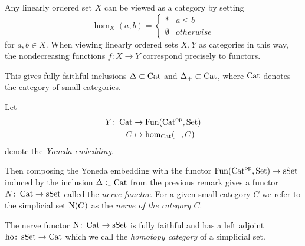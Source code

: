 \begin{remark}
    Any linearly ordered set $X$ can be viewed as a category by setting
    \begin{equation*}
        \hom_{X}(a,b)=\begin{cases}
            * & a\leq b\\
            \emptyset & otherwise
        \end{cases}
    \end{equation*}
    for $a,b\in X$.
    When viewing linearly ordered sets $X,Y$ as categories in this way, the nondecreasing functions $f\colon X\to Y$ correspond precisely to functors.

    This gives fully faithful inclusions $\Delta\subset\operatorname{Cat}$ and $\Delta_+\subset\operatorname{Cat}$, where $\operatorname{Cat}$ denotes the category of small categories.
\end{remark}
\begin{definition}
    Let
    \begin{align*}
        Y\colon\operatorname{Cat}&\to\operatorname{Fun}(\operatorname{Cat}^{\operatorname{op}},\operatorname{Set})\\
        C&\mapsto\hom_{\operatorname{Cat}}(-,C)
    \end{align*}
    denote the \emph{Yoneda embedding}.

    Then composing the Yoneda embedding with the functor $\operatorname{Fun}(\operatorname{Cat}^{\operatorname{op}},\operatorname{Set})\to\operatorname{sSet}$ induced by the inclusion $\Delta\subset\operatorname{Cat}$ from the previous remark gives a functor $N\colon\operatorname{Cat}\to\operatorname{sSet}$ called the \emph{nerve functor}.
    For a given small category $C$ we refer to the simplicial set $\operatorname{N}(C)$ as the \emph{nerve of the category $C$}.
\end{definition}
\begin{lemma}
    The nerve functor $\operatorname{N}\colon\operatorname{Cat}\to\operatorname{sSet}$ is fully faithful and has a left adjoint $\operatorname{ho}\colon\operatorname{sSet}\to\operatorname{Cat}$ which we call the \emph{homotopy category} of a simplicial set.
    \begin{reference}
        \cite[Proposition 1.2.2.1]{kerodon}
    \end{reference}
\end{lemma}
